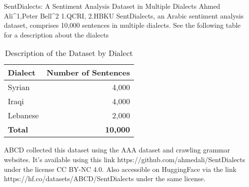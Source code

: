 SentDialects: A Sentiment Analysis Dataset in Multiple Dialects
Ahmed Ali^1,Peter Bell^2
1.QCRI, 2.HBKU
SentDialects, an Arabic sentiment analysis dataset, comprises 10,000 sentences in multiple dialects. See the following table for 
a description about the dialects
\begin{table}[ht]
    \centering
    \begin{tabular}{lr}
    \toprule
    \textbf{Dialect}   & \textbf{Number of Sentences} \\
    \midrule
    Syrian     & 4,000  \\
    Iraqi      & 4,000  \\
    Lebanese   & 2,000  \\
    \midrule
    \textbf{Total} & \textbf{10,000} \\
    \bottomrule
    \end{tabular}
    \caption{Description of the Dataset by Dialect}
    \label{tab:dataset_description}
    \end{table}

ABCD collected this dataset using the AAA dataset and crawling grammar websites. 
It’s available using this link https://github.com/ahmedali/SentDialects  under the license CC BY-NC 4.0. 
Also accessible on HuggingFace via the link https://hf.co/datasets/ABCD/SentDialects under the same license.